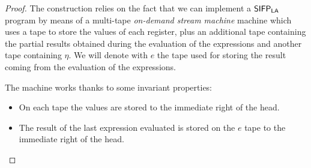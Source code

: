 \begin{proof}
%
The construction relies on the fact that we can implement a $\mathsf{SIFP_{{\mathsf{LA}}}}$ program
by means of a multi-tape \emph{on-demand stream machine} machine
which uses a tape to store the values
of each register, plus an additional tape containing the partial results
obtained during the evaluation of the expressions
and another tape containing $\eta$.
%
We will denote with $e$ the tape used for storing the result coming from
the evaluation of the expressions.

The machine works thanks to some invariant properties:
%
\begin{itemize}
\item On each tape the values are stored to the immediate right of the head.
\item The result of the last expression evaluated is stored on the $e$ tape to the immediate right of the head.
\end{itemize}



\end{proof}
